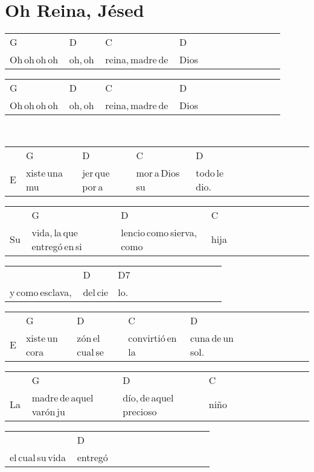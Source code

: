 \section*{Oh Reina, Jésed\hfill}
\begin{multicols}{2}
\noindent
\begin{minipage}{\columnwidth}
\noindent
\noindent
\begin{tabular}{llllllllllll}
G&D&C&D\\
Oh\,oh\,oh\,oh\,&oh,\,oh\,&reina,\,madre\,de\,&Dios
\end{tabular}

\noindent
\begin{tabular}{llllllllllll}
G&D&C&D\\
Oh\,oh\,oh\,oh\,&oh,\,oh\,&reina,\,madre\,de\,&Dios
\end{tabular}
\end{minipage}\\

\noindent
\begin{minipage}{\columnwidth}
\noindent
\noindent
\begin{tabular}{llllllllllll}
&G&D&C&D\\
E&xiste\,una\,mu&jer\,que\,por\,a&mor\,a\,Dios\,su\,&todo\,le\,dio.
\end{tabular}

\noindent
\begin{tabular}{llllllllllll}
&G&D&C\\
Su\,&vida,\,la\,que\,entregó\,en\,si&lencio\,como\,sierva,\,como\,&hija
\end{tabular}

\noindent
\begin{tabular}{llllllllllll}
&D&D7\\
y\,como\,esclava,\,&del\,cie&lo.
\end{tabular}

\noindent
\begin{tabular}{llllllllllll}
&G&D&C&D\\
E&xiste\,un\,cora&zón\,el\,cual\,se\,&convirtió\,en\,la\,&cuna\,de\,un\,sol.
\end{tabular}

\noindent
\begin{tabular}{llllllllllll}
&G&D&C\\
La\,&madre\,de\,aquel\,varón\,ju&dío,\,de\,aquel\,precioso\,&niño
\end{tabular}

\noindent
\begin{tabular}{llllllllllll}
&D\\
el\,cual\,su\,vida\,&entregó
\end{tabular}
\end{minipage}\\


\end{multicols}
